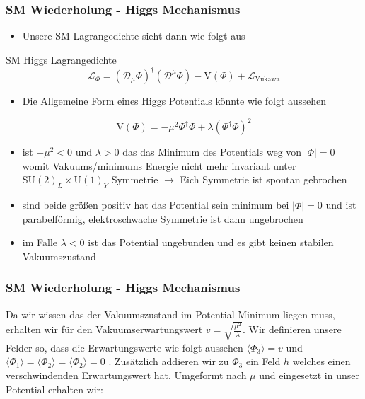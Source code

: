 \documentclass{beamer}
\begin{document}
\begin{frame}
\frametitle{SM Wiederholung - Higgs Mechanismus }
\begin{itemize}
\item Unsere SM Lagrangedichte sieht dann wie folgt aus
\end{itemize}
\begin{block}{SM Higgs Lagrangedichte}
\begin{equation}
\mathscr{L}_{\Phi}=(\mathscr{D}_{\mu}\Phi)^{\dagger}(\mathscr{D}^{\mu}\Phi) - \text{V}(\Phi) + \mathscr{L}_{\text{Yukawa}}
\end{equation}
\end{block}
\begin{itemize}
\item Die Allgemeine Form eines Higgs Potentials könnte wie folgt aussehen 
\end{itemize}
\begin{equation}
 \text{V}(\Phi)=-\mu^{2} \Phi^{\dagger}\Phi +\lambda ( \Phi^{\dagger}\Phi)^{2}
\end{equation}
\end{frame}
\begin{frame}
\begin{itemize}
\item ist $-\mu^{2}<0$ und $\lambda>0$  das das Minimum des Potentials weg von $|\Phi|=0$ womit Vakuums/minimums Energie nicht mehr invariant unter $\text{SU}(2)_{L}\times\text{U}(1)_{Y}$ Symmetrie $\rightarrow$ Eich Symmetrie ist spontan gebrochen
\item sind beide größen positiv hat das Potential sein minimum bei  $|\Phi|=0$  und ist parabelförmig, elektroschwache Symmetrie ist dann ungebrochen
\item im Falle $\lambda<0$ ist das Potential ungebunden und es gibt keinen stabilen Vakuumszustand
\end{itemize}
\end{frame}

\begin{frame}
\frametitle{SM Wiederholung - Higgs Mechanismus }
Da wir wissen das der Vakuumszustand im Potential Minimum liegen muss, erhalten wir für den Vakuumserwartungswert $v=\sqrt{\frac{\mu^2}{\lambda}}$. Wir definieren unsere Felder so, dass die Erwartungswerte wie folgt aussehen $\langle \Phi_{3}\rangle=v$ und  $\langle \Phi_{1}\rangle=\langle \Phi_{2}\rangle=\langle \Phi_{2}\rangle=0$ . Zusätzlich addieren wir zu $\Phi_{3}$ ein Feld $h$ welches einen verschwindenden Erwartungswert hat. Umgeformt nach $\mu$ und eingesetzt in unser Potential erhalten wir:
\end{frame}
\end{document}
